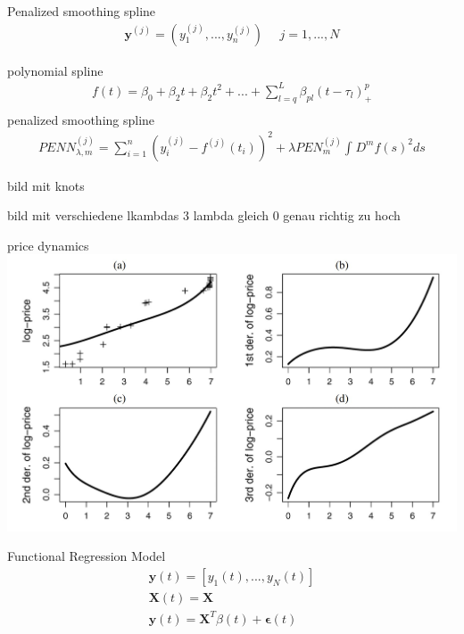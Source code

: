 \documentclass[hyperref={pdfpagelabels=false}]{beamer}
\begin{document}
\begin{frame}{Penalized smoothing spline}
\begin{align*}
\mathbf{y}^{(j)}=(y_1^{(j)},...,y_n^{(j)}) \ \ \ \ \ \	 j=1,...,N 
\end{align*}

polynomial spline %
\begin{align*}
f(t)=\beta_0+\beta_2t+\beta_2t^2+...+\sum_{l=q}^L \beta_{pl}(t-\tau_l)^p_+ \\ 
\end{align*}
penalized smoothing spline
\begin{align*}
PENN^{(j)}_{\lambda,m}=\sum_{i=1}^n (y_i^{(j)}-f^{(j)}(t_i))^2+\lambda PEN^{(j)}_m \int_{}^{}D^mf(s)^2 ds %
\end{align*}
\end{frame}

\begin{frame}{bild mit knots}

\end{frame}

\begin{frame}{bild mit verschiedene lkambdas 3 lambda gleich 0 genau richtig zu hoch}

\end{frame}

\begin{frame}{price dynamics} %
\center
\includegraphics[width=1\textwidth]{smooth_velocity} %
\end{frame}


\begin{frame}{Functional Regression Model} %
\begin{align}
\mathbf{y}(t) = [y_1(t),...,y_N(t)] \nonumber \\ \mathbf{X}(t)=\mathbf{X} \nonumber \\ \mathbf{y}(t)=\mathbf{X}^T\beta(t)+\mathbf{\epsilon}(t) \nonumber 
\end{align}
\end{frame}
\end{document}
